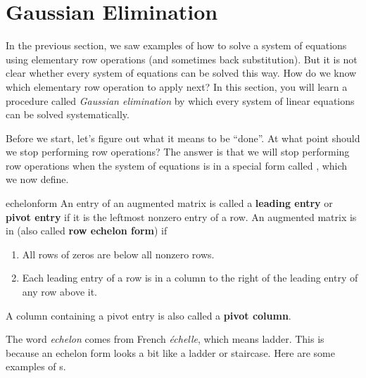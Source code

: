 \section{Gaussian Elimination}

In the previous section, we saw examples of how to solve a system of
equations using elementary row operations (and sometimes back
substitution). But it is not clear whether every system of equations
can be solved this way. How do we know which elementary row operation
to apply next? In this section, you will learn a procedure called {\em
  Gaussian elimination} by which every system of linear equations can
be solved systematically.

Before we start, let's figure out what it means to be ``done''. At
what point should we stop performing row operations? The answer is
that we will stop performing row operations when the system of
equations is in a special form called {\em {\ef}}, which we now define.

\begin{definition}{\EF}{echelonform}
  An entry of an augmented matrix is called a
  \textbf{leading entry} or
  \textbf{pivot entry}
  if it is the leftmost nonzero entry of a row. 
  An augmented matrix is in
  \textbf{\ef}\eindex{\ef}
  (also called \textbf{row echelon form}) if
  \begin{enumerate}
  \item All rows of zeros are below all nonzero rows.
    
  \item Each leading entry of a row is in a column to the right of the
    leading entry of any row above it.
  \end{enumerate}
  A column containing a pivot entry is also called a
  \textbf{pivot column}.
\end{definition}

The word {\em echelon} comes from French {\em \'echelle}, which means
ladder. This is because an echelon form looks a bit like a ladder or
staircase. Here are some examples of {\ef}s.


